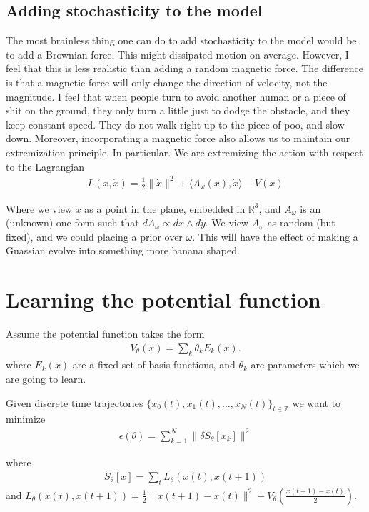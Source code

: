 \documentclass[12pt]{amsart}
\begin{document}
\subsection{Adding stochasticity to the model}
The most brainless thing one can do to add stochasticity to the model would be to add a Brownian force.
This might dissipated motion on average.
However, I feel that this is less realistic than adding a random magnetic force.
The difference is that a magnetic force will only change the direction of velocity, not the magnitude.
I feel that when people turn to avoid another human or a piece of shit on the ground, they only turn a little just to dodge the obstacle, and they keep constant speed.  They do not walk right up to the piece of poo, and slow down.
Moreover, incorporating a magnetic force also allows us to maintain our extremization principle.
In particular.  We are extremizing the action with respect to the Lagrangian
\begin{align*}
L(x,\dot{x} ) = \frac{1}{2} \| \dot{x} \|^2 + \langle A_\omega(x) , \dot{x} \rangle - V(x)
\end{align*}

Where we view $x$ as a point in the plane, embedded in $\mathbb{R}^3$, and $A_\omega$ is an (unknown) one-form such that $dA_\omega \propto dx\wedge dy$.
We view $A_\omega$ as random (but fixed), and we could placing a prior over $\omega$.
This will have the effect of making a Guassian evolve into something more banana shaped.

\section{Learning the potential function}
\label{sec:learning}
Assume the potential function takes the form
\begin{align*}
    V_\theta (x) = \sum_{k} \theta_k E_k (x).
\end{align*}
where $E_k(x)$ are a fixed set of basis functions, and $\theta_k$ are parameters which we are going to learn.

Given discrete time trajectories $\{x_0(t),x_1(t),\dots,x_N(t)\}_{t\in \mathbb{Z}}$ we want to minimize
\begin{align*}
    \epsilon(\theta) = \sum_{k=1}^N \| \delta  S_\theta[x_k] \|^2
\end{align*}

where
\begin{align*}
    S_\theta[x] = \sum_{t} L_\theta(x(t),x(t+1))
\end{align*}
and $L_\theta(x(t),x(t+1)) = \frac{1}{2} \| x(t+1) - x(t) \|^2 + V_\theta \left( \frac{ x(t+1) - x(t) }{2} \right)$.
\end{document}
